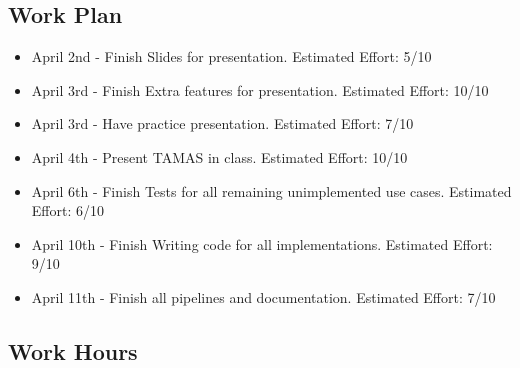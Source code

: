 \documentclass[12pt]{article}
\begin{document}
 \subsection{Work Plan}

\begin{itemize}
   \item April 2nd - Finish Slides for presentation. Estimated Effort: 5/10
   \item  April 3rd - Finish Extra features for presentation. Estimated Effort: 10/10
   \item  April 3rd - Have practice presentation. Estimated Effort: 7/10
   \item  April 4th - Present TAMAS in class. Estimated Effort: 10/10
   \item  April 6th - Finish Tests for all remaining unimplemented use cases. Estimated Effort: 6/10
   \item  April 10th - Finish Writing code for all implementations. Estimated Effort: 9/10
   \item April 11th - Finish all pipelines and documentation. Estimated Effort: 7/10
    
\end{itemize}

 \subsection{Work Hours}
\end{document}
